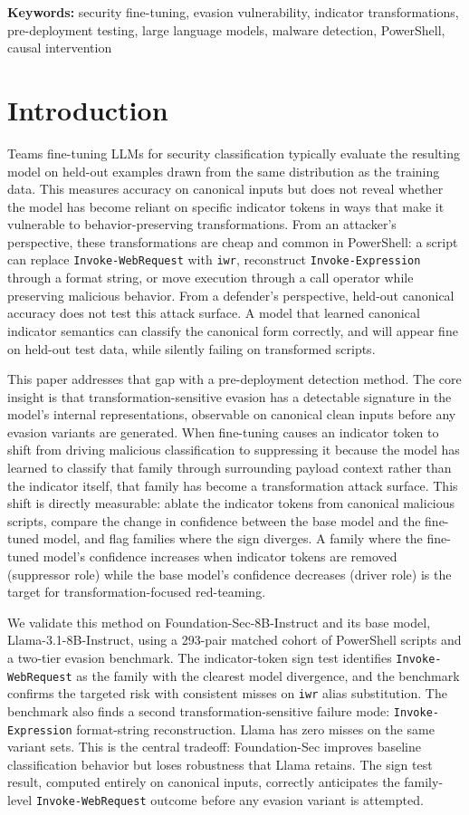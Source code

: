 \documentclass{article}
\begin{document}
\textbf{Keywords:} security fine-tuning, evasion vulnerability, indicator transformations, pre-deployment testing, large language models, malware detection, PowerShell, causal intervention

\section{Introduction}
Teams fine-tuning LLMs for security classification typically evaluate the resulting model on held-out examples drawn from the same distribution as the training data. This measures accuracy on canonical inputs but does not reveal whether the model has become reliant on specific indicator tokens in ways that make it vulnerable to behavior-preserving transformations. From an attacker's perspective, these transformations are cheap and common in PowerShell: a script can replace \texttt{Invoke-WebRequest} with \texttt{iwr}, reconstruct \texttt{Invoke-Expression} through a format string, or move execution through a call operator while preserving malicious behavior. From a defender's perspective, held-out canonical accuracy does not test this attack surface. A model that learned canonical indicator semantics can classify the canonical form correctly, and will appear fine on held-out test data, while silently failing on transformed scripts.

This paper addresses that gap with a pre-deployment detection method. The core insight is that transformation-sensitive evasion has a detectable signature in the model's internal representations, observable on canonical clean inputs before any evasion variants are generated. When fine-tuning causes an indicator token to shift from driving malicious classification to suppressing it because the model has learned to classify that family through surrounding payload context rather than the indicator itself, that family has become a transformation attack surface. This shift is directly measurable: ablate the indicator tokens from canonical malicious scripts, compare the change in confidence between the base model and the fine-tuned model, and flag families where the sign diverges. A family where the fine-tuned model's confidence increases when indicator tokens are removed (suppressor role) while the base model's confidence decreases (driver role) is the target for transformation-focused red-teaming.

We validate this method on Foundation-Sec-8B-Instruct and its base model, Llama-3.1-8B-Instruct, using a 293-pair matched cohort of PowerShell scripts and a two-tier evasion benchmark. The indicator-token sign test identifies \texttt{Invoke-WebRequest} as the family with the clearest model divergence, and the benchmark confirms the targeted risk with consistent misses on \texttt{iwr} alias substitution. The benchmark also finds a second transformation-sensitive failure mode: \texttt{Invoke-Expression} format-string reconstruction. Llama has zero misses on the same variant sets. This is the central tradeoff: Foundation-Sec improves baseline classification behavior but loses robustness that Llama retains. The sign test result, computed entirely on canonical inputs, correctly anticipates the family-level \texttt{Invoke-WebRequest} outcome before any evasion variant is attempted.
\end{document}
